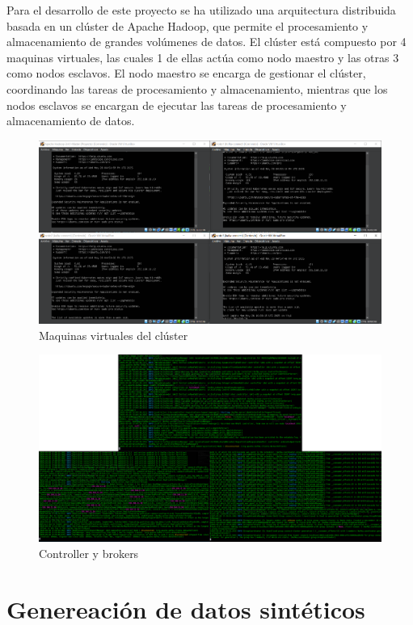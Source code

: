 \documentclass[12pt]{article}
\begin{document}
Para el desarrollo de este proyecto se ha utilizado una arquitectura distribuida basada en un clúster de Apache Hadoop,
que permite el procesamiento y almacenamiento de grandes volúmenes de datos. El clúster está compuesto por 4 maquinas virtuales,
las cuales 1 de ellas actúa como nodo maestro y las otras 3 como nodos esclavos.
El nodo maestro se encarga de gestionar el clúster, coordinando las tareas de procesamiento y almacenamiento,
mientras que los nodos esclavos se encargan de ejecutar las tareas de procesamiento y almacenamiento de datos.

\begin{figure}[h!]
    \centering
    \includegraphics[width=.7\textwidth]{assets/proyecto/maquinas.PNG}
    \caption{Maquinas virtuales del clúster}
    \label{fig:my_label}
\end{figure}

\begin{figure}[h!]
    \centering
    \includegraphics[width=.7\textwidth]{assets/proyecto/cluster.png}
    \caption{Controller y brokers}
    \label{fig:my_label}
\end{figure}

\clearpage

\section{Genereación de datos sintéticos}
\end{document}

